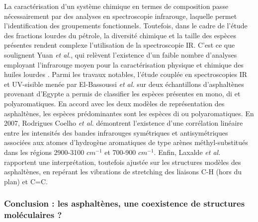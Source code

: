 \documentclass[12pt,a4paper]{book}
\begin{document}
La caractérisation d'un système chimique en termes de composition passe nécessairement par des analyses en spectroscopie infrarouge, laquelle permet l'identification des groupements fonctionnels. Toutefois, dans le cadre de l'étude des fractions lourdes du pétrole, la diversité chimique et la taille des espèces présentes rendent complexe l'utilisation de la spectroscopie IR. C'est ce que soulignent Yuan \textit{et al.}, qui relèvent l'existence d'un faible nombre d'analyses employant l'infrarouge moyen pour la caractérisation physique et chimique des huiles lourdes \cite{hongfu2006determination}. 
Parmi les travaux notables, l'étude couplée en spectroscopies IR et UV-sisible menée par El-Bassoussi \textit{et al.}\cite{el2010characterization} sur deux échantillons d'asphaltènes provenant d'Egypte a permis de classifier les espèces présentes en mono, di et polyaromatiques. En accord avec les deux modèles de représentation des asphaltènes, les espèces prédominantes sont les espèces di ou polyaromatiques. En 2007, Rodrigues Coelho \textit{et al.} \cite{coelho2007characterization} démontrent l'existence d'une corrélation linéaire entre les intensités des bandes infrarouges symétriques et antisymétriques associées aux atomes d'hydrogène aromatiques de type arènes méthyl-substitués dans les régions 2900-3100 $cm^{-1}$ et 700-900 $cm^{-1}$. Enfin, Laxalde \textit{et al.} \cite{laxalde2014combining} rapportent une interprétation, toutefois ajustée sur les structures modèles des asphaltènes, en repérant les vibrations de stretching des liaisons C-H (hors du plan) et C=C.

\bigskip

\subsubsection{Conclusion : les asphaltènes, une coexistence de structures moléculaires ?}
\end{document}
